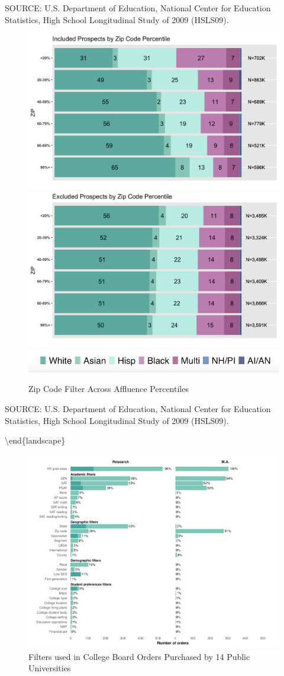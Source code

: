 \documentclass[
  12pt,
]{article}
\begin{document}
SOURCE: U.S. Department of Education, National Center for Education Statistics, High School Longitudinal Study of 2009 (HSLS09).
\endgroup

\begin{figure}

{\centering \includegraphics[width=0.4\linewidth]{./../../outputs/figures/p3_zip_incV2} \includegraphics[width=0.4\linewidth]{./../../outputs/figures/p3_zip_excV2} \includegraphics[width=0.4\linewidth]{./../../outputs/figures/legend_horizontal} 

}

\caption{Zip Code Filter Across Affluence Percentiles}\label{fig:zipcode-affluence}
\end{figure}

\begingroup
\fontsize{8}{8}\selectfont

SOURCE: U.S. Department of Education, National Center for Education Statistics, High School Longitudinal Study of 2009 (HSLS09).
\endgroup

\textbackslash end\{landscape\}
\pagebreak
\restoregeometry

\begin{figure}
\centering
\includegraphics{eepa_student_list_manuscript_c_a_files/figure-latex/order-filters-empirical-report-1.pdf}
\caption{\label{fig:order-filters-empirical-report}Filters used in College Board Orders Purchased by 14 Public Universities}
\end{figure}
\end{document}
